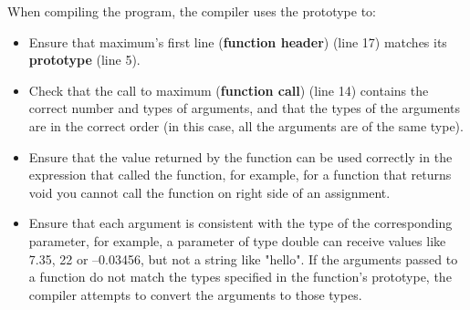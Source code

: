 \documentclass[10pt]{beamer}
\begin{document}
\begin{frame}
	\justifying\small
	When compiling the program, the compiler uses the prototype to:
	\vspace{10pt}
	\begin{itemize}
		\setlength\itemsep{1em}\justifying\small
		\item Ensure that maximum’s first line (\textbf{function header}) {\footnotesize (line 17)} matches its \textbf{prototype} {\footnotesize (line 5)}.
		\item Check that the call to maximum (\textbf{function call}) {\footnotesize (line 14)} contains the correct number and types
		of arguments, and that the types of the arguments are in the correct order (in this
		case, all the arguments are of the same type).
		
		\item Ensure that the value returned by the function can be used correctly in the expression that called the function, for example, for a function that returns void
		you cannot call the function on right side of an assignment.
		
		\item Ensure that each argument is consistent with the type of the corresponding parameter, for example, a parameter of type double can receive values like 7.35, 22 or
		–0.03456, but not a string like "hello". If the arguments passed to a function do
		not match the types specified in the function’s prototype, the compiler attempts
		to convert the arguments to those types. 
	\end{itemize}
\end{frame}
\end{document}
